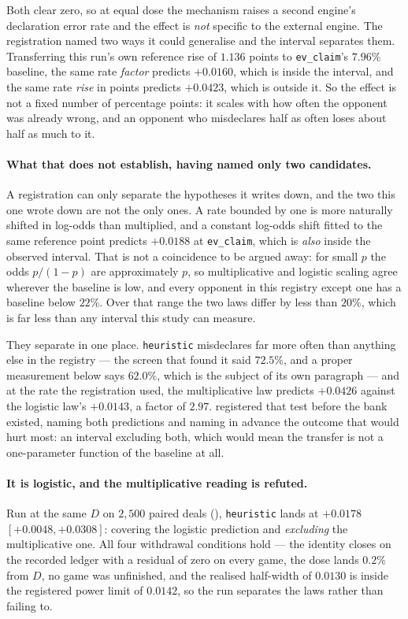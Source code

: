 \documentclass[11pt,letterpaper]{article}
\begin{document}
\noindent Both clear zero, so at equal dose the mechanism raises a second
engine's declaration error rate and the effect is \emph{not} specific to
the external engine. The registration named two ways it could generalise and
the interval separates them. Transferring this run's own reference rise of
$1.136$ points to \texttt{ev\_claim}'s $7.96\%$ baseline, the same rate
\emph{factor} predicts $+0.0160$, which is inside the interval, and the same
rate \emph{rise} in points predicts $+0.0423$, which is outside it. So the
effect is not a fixed number of percentage points: it scales with how often
the opponent was already wrong, and an opponent who misdeclares half as often
loses about half as much to it.

\paragraph{What that does not establish, having named only two candidates.}
A registration can only separate the hypotheses it writes down, and the two
this one wrote down are not the only ones. A rate bounded by one is more
naturally shifted in log-odds than multiplied, and a constant log-odds shift
fitted to the same reference point predicts $+0.0188$ at \texttt{ev\_claim},
which is \emph{also} inside the observed interval. That is not a coincidence
to be argued away: for small $p$ the odds $p/(1-p)$ are approximately $p$, so
multiplicative and logistic scaling agree wherever the baseline is low, and
every opponent in this registry except one has a baseline below $22\%$. Over
that range the two laws differ by less than $20\%$, which is far less than any
interval this study can measure.

They separate in one place. \texttt{heuristic} misdeclares far more often
than anything else in the registry --- the screen that found it said $72.5\%$,
and a proper measurement below says $62.0\%$, which is the subject of its own
paragraph --- and at the rate the registration used, the multiplicative law
predicts $+0.0426$ against the logistic law's $+0.0143$, a factor of $2.97$.
 registered that test before the bank existed,
naming both predictions and naming in advance the outcome that would hurt most:
an interval excluding both, which would mean the transfer is not a
one-parameter function of the baseline at all.

\paragraph{It is logistic, and the multiplicative reading is refuted.} Run at
the same $D$ on $2{,}500$ paired deals
(), \texttt{heuristic} lands at
$+0.0178$ $[+0.0048, +0.0308]$: covering the logistic prediction and
\emph{excluding} the multiplicative one. All four withdrawal conditions hold
--- the identity closes on the recorded ledger with a residual of zero on every
game, the dose lands $0.2\%$ from $D$, no game was unfinished, and the realised
half-width of $0.0130$ is inside the registered power limit of $0.0142$, so the
run separates the laws rather than failing to.
\end{document}
